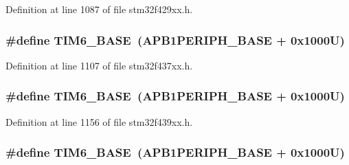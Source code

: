 Definition at line 1087 of file stm32f429xx.\+h.

\subsubsection[{\texorpdfstring{T\+I\+M6\+\_\+\+B\+A\+SE}{TIM6_BASE}}]{\setlength{\rightskip}{0pt plus 5cm}\#define T\+I\+M6\+\_\+\+B\+A\+SE~({\bf A\+P\+B1\+P\+E\+R\+I\+P\+H\+\_\+\+B\+A\+SE} + 0x1000\+U)}\hypertarget{group___peripheral__memory__map_ga8268ec947929f192559f28c6bf7d1eac}{}\label{group___peripheral__memory__map_ga8268ec947929f192559f28c6bf7d1eac}


Definition at line 1107 of file stm32f437xx.\+h.

\subsubsection[{\texorpdfstring{T\+I\+M6\+\_\+\+B\+A\+SE}{TIM6_BASE}}]{\setlength{\rightskip}{0pt plus 5cm}\#define T\+I\+M6\+\_\+\+B\+A\+SE~({\bf A\+P\+B1\+P\+E\+R\+I\+P\+H\+\_\+\+B\+A\+SE} + 0x1000\+U)}\hypertarget{group___peripheral__memory__map_ga8268ec947929f192559f28c6bf7d1eac}{}\label{group___peripheral__memory__map_ga8268ec947929f192559f28c6bf7d1eac}


Definition at line 1156 of file stm32f439xx.\+h.

\subsubsection[{\texorpdfstring{T\+I\+M6\+\_\+\+B\+A\+SE}{TIM6_BASE}}]{\setlength{\rightskip}{0pt plus 5cm}\#define T\+I\+M6\+\_\+\+B\+A\+SE~({\bf A\+P\+B1\+P\+E\+R\+I\+P\+H\+\_\+\+B\+A\+SE} + 0x1000\+U)}\hypertarget{group___peripheral__memory__map_ga8268ec947929f192559f28c6bf7d1eac}{}\label{group___peripheral__memory__map_ga8268ec947929f192559f28c6bf7d1eac}


